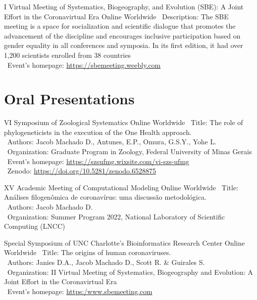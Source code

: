\documentclass[11pt, letterpaper, sans]{moderncv}
\begin{document}
	{I Virtual Meeting of Systematics, Biogeography, and Evolution (SBE): A Joint Effort in the Coronavirtual Era}
	{Online}
	{Worldwide}
	{}
	{
		\textbullet~Description: The SBE meeting is a space for socialization and scientific dialogue that promotes the advancement of the discipline and encourages inclusive participation based on gender equality in all conferences and symposia. In its first edition, it had over 1,200 scientists enrolled from 38 countries\\
		\textbullet~Event's homepage: \url{https://sbemeeting.weebly.com}
	}


\section{Oral Presentations}

	{VI Symposium of Zoological Systematics}
	{Online}
	{Worldwide}
	{}
	{
		\textbullet~Title: The role of phylogeneticists in the execution of the One Health approach.\\
		\textbullet~Authors: Jacob Machado D., Antunes, E.P., Omura, G.S.Y., Yohe L.\\
		\textbullet~Organization: Graduate Program in Zoology, Federal University of Minas Gerais\\
		\textbullet~Event's homepage: \url{https://szsufmg.wixsite.com/vi-szs-ufmg}\\
		\textbullet~Zenodo: \url{https://doi.org/10.5281/zenodo.6528875}
	}

\cventry{---}
	{XV Academic Meeting of Computational Modeling}
	{Online}
	{Worldwide}
	{}
	{
		\textbullet~Title: Análises filogenômica de coronavírus: uma discussão metodológica.\\
		\textbullet~Authors: Jacob Machado D.\\
		\textbullet~Organization: Summer Program 2022, National Laboratory of Scientific Computing (LNCC)\\
	}

	{Special Symposium of UNC Charlotte's Bioinformatics Research Center}
	{Online}
	{Worldwide}
	{}
	{
		\textbullet~Title: The origins of human coronaviruses.\\
		\textbullet~Authors: Janies D.A., Jacob Machado D., Scott R. \& Guirales S.\\
		\textbullet~Organization: II Virtual Meeting of Systematics, Biogeography and Evolution: A Joint Effort in the Coronavirtual Era\\
		\textbullet~Event's homepage: \url{https:/www.sbemeeting.com}
	}
\end{document}
